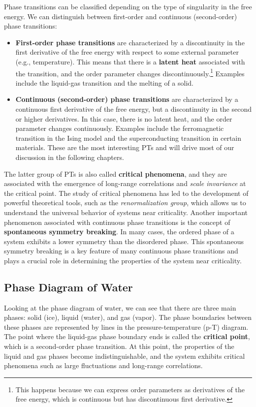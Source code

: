 Phase transitions can be classified depending on the type of singularity in the free energy. We can distinguish between first-order and continuous (second-order) phase transitions:
\begin{itemize}
    \item \textbf{First-order phase transitions} are characterized by a discontinuity in the first derivative of the free energy with respect to some external parameter (e.g., temperature). This means that there is a \textbf{latent heat} associated with the transition, and the order parameter changes discontinuously.\footnote{This happens because we can express order parameters as derivatives of the free energy, which is continuous but has discontinuous first derivative.} Examples include the liquid-gas transition and the melting of a solid.
    \item \textbf{Continuous (second-order) phase transitions} are characterized by a continuous first derivative of the free energy, but a discontinuity in the second or higher derivatives. In this case, there is no latent heat, and the order parameter changes continuously. Examples include the ferromagnetic transition in the Ising model and the superconducting transition in certain materials. These are the most interesting PTs and will drive most of our discussion in the following chapters.
\end{itemize}
The latter group of PTs is also called \textbf{critical phenomena}, and they are associated with the emergence of long-range correlations and \textit{scale invariance} at the critical point. The study of critical phenomena has led to the development of powerful theoretical tools, such as the \textit{renormalization group}, which allows us to understand the universal behavior of systems near criticality.
Another important phenomenon associated with continuous phase transitions is the concept of \textbf{spontaneous symmetry breaking}. In many cases, the ordered phase of a system exhibits a lower symmetry than the disordered phase. This spontaneous symmetry breaking is a key feature of many continuous phase transitions and plays a crucial role in determining the properties of the system near criticality.

\subsection{Phase Diagram of Water}

 Looking at the phase diagram of water, we can see that there are three main phases: solid (ice), liquid (water), and gas (vapor). The phase boundaries between these phases are represented by lines in the pressure-temperature (p-T) diagram. The point where the liquid-gas phase boundary ends is called the \textbf{critical point}, which is a second-order phase transition. At this point, the properties of the liquid and gas phases become indistinguishable, and the system exhibits critical phenomena such as large fluctuations and long-range correlations.

